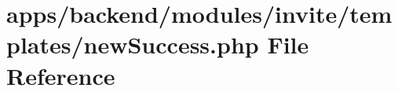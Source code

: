 \hypertarget{backend_2modules_2invite_2templates_2new_success_8php}{\section{apps/backend/modules/invite/templates/new\-Success.php File Reference}
\label{backend_2modules_2invite_2templates_2new_success_8php}
}
